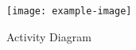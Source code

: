 \blindtext
\begin{figure}[p]
	\caption{Activity Diagram}
	\centering
	\texttt{[image: example-image]}
	\label{fig:dia:activity}
\end{figure}
